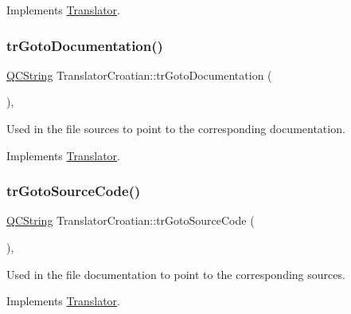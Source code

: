 Implements \mbox{\hyperlink{class_translator}{Translator}}.

\mbox{\label{class_translator_croatian_aabde4bac34e98b47a4eb3536d6eda47a}} 
\subsubsection{\texorpdfstring{trGotoDocumentation()}{trGotoDocumentation()}}
{\footnotesize\ttfamily \mbox{\hyperlink{class_q_c_string}{Q\+C\+String}} Translator\+Croatian\+::tr\+Goto\+Documentation (\begin{DoxyParamCaption}{ }\end{DoxyParamCaption})\hspace{0.3cm}{\ttfamily [inline]}, {\ttfamily [virtual]}}

Used in the file sources to point to the corresponding documentation. 

Implements \mbox{\hyperlink{class_translator}{Translator}}.

\mbox{\label{class_translator_croatian_ac2325fb02e0c05ec60f29aa20f03f92f}} 
\subsubsection{\texorpdfstring{trGotoSourceCode()}{trGotoSourceCode()}}
{\footnotesize\ttfamily \mbox{\hyperlink{class_q_c_string}{Q\+C\+String}} Translator\+Croatian\+::tr\+Goto\+Source\+Code (\begin{DoxyParamCaption}{ }\end{DoxyParamCaption})\hspace{0.3cm}{\ttfamily [inline]}, {\ttfamily [virtual]}}

Used in the file documentation to point to the corresponding sources. 

Implements \mbox{\hyperlink{class_translator}{Translator}}.

\mbox{\label{class_translator_croatian_ae2e59a38e3ee83ff4e28a89bc9ec7291}} 
